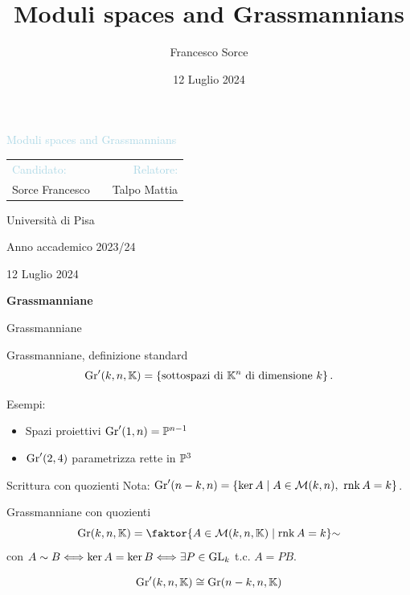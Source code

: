 \documentclass[a4paper]{beamer}
\title{Moduli spaces and Grassmannians}
\author{Francesco Sorce}
\institute[]{Universit\`a di Pisa}
\date{12 Luglio 2024}
\begin{document}
\begin{frame}{}
\begin{center}
{\Large \textcolor{LightBlue}{Moduli spaces and Grassmannians}}
\vspace{1cm}

\begin{tabular}{lm{4.5cm}r}
\textcolor{LightBlue}{Candidato:} && \textcolor{LightBlue}{Relatore:}\\
Sorce Francesco && Talpo Mattia
\end{tabular}
\vspace{1cm}

{\footnotesize Universit\`a di Pisa

Anno accademico 2023/24}
\medskip
\vspace{0.5cm}

12 Luglio 2024
\end{center}
\end{frame}


\begin{frame}{}
\begin{center}
{\huge \textbf{Grassmanniane}}
\end{center}
\end{frame}

\begin{frame}{Grassmanniane}
\begin{block}{Grassmanniane, definizione standard}
\[\mathrm{Gr}'(k,n,\mathbb{K})=\left\{{\text{sottospazi di $\mathbb{K}^n$ di dimensione $k$}}\right\}.\]
\end{block}
\bigskip

\pause
Esempi:
\begin{itemize}
\item Spazi proiettivi $\mathrm{Gr}'(1,n)=\mathbb{P}^{n-1}$\pause
\item $\mathrm{Gr}'(2,4)$ parametrizza rette in $\mathbb{P}^3$
\end{itemize}
\end{frame}

\begin{frame}{Scrittura con quozienti}
Nota: $\mathrm{Gr}'(n-k,n)=\left\{{\ker A\mid A\in \mathcal{M}(k,n),\ \mathrm{rnk}\, A=k}\right\}$.
\medskip

\begin{block}{Grassmanniane con quozienti}
\[\Gr(k,n,\K)=\quot{\cpa{A\in \Mc(k,n,\K)\mid \rnk A=k}}\sim\]
con $A\sim B\Longleftrightarrow \ker A=\ker B\Longleftrightarrow \exists P\in\mathrm{GL}_k$ t.c. $A=PB$.
\end{block}
\medskip
\[\mathrm{Gr}'(k,n,\mathbb{K})\cong\mathrm{Gr}(n-k,n,\mathbb{K})\]
\end{frame}
\end{document}
